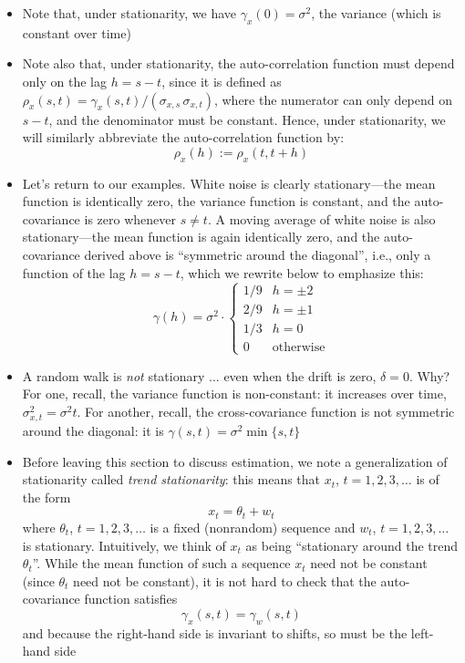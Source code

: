 \documentclass{article}
\begin{document}
\begin{itemize}
\item Note that, under stationarity, we have $\gamma_x(0) = \sigma^2$, the
  variance (which is constant over time) 

\item Note also that, under stationarity, the auto-correlation function must
  depend only on the lag $h = s-t$, since it is defined as $\rho_x(s, t) =
  \gamma_x(s, t) / ( \sigma_{x,s} \, \sigma_{x,t} )$, where the numerator can  
  only depend on $s-t$, and the denominator must be constant. Hence, under
  stationarity, we will similarly abbreviate the auto-correlation function by:
  \[
  \rho_x(h) := \rho_x(t, t+h)
  \]

\item Let's return to our examples. White noise is clearly stationary---the mean 
  function is identically zero, the variance function is constant, and the
  auto-covariance is zero whenever $s \not= t$. A moving average of white noise 
  is also stationary---the mean function is again identically zero, and the
  auto-covariance derived above is ``symmetric around the diagonal'', i.e., only
  a function of the lag $h = s-t$, which we rewrite below to emphasize this:   
  \[
  \gamma(h) = \sigma^2 \cdot
  \begin{cases}
  1 / 9 & h = \pm 2 \\
  2 / 9 & h = \pm 1 \\
  1 / 3 & h = 0 \\
  0 & \text{otherwise}
  \end{cases}
  \]

\item A random walk is \emph{not} stationary ... even when the drift is zero,
  $\delta = 0$. Why? For one, recall, the variance function is non-constant: it
  increases over time, $\sigma^2_{x,t} = \sigma^2 t$. For another, recall, the 
  cross-covariance function is not symmetric around the diagonal: it is
  $\gamma(s,t) = \sigma^2 \min\{s,t\}$ 

\item Before leaving this section to discuss estimation, we note a
  generalization of stationarity called \emph{trend stationarity}: this means
  that $x_t$, $t = 1,2,3,\dots$ is of the form 
  \[ 
  x_t = \theta_t + w_t
  \]
  where $\theta_t$, $t = 1,2,3,\dots$ is a fixed (nonrandom) sequence and $w_t$,
  $t = 1,2,3,\dots$ is stationary. Intuitively, we think of $x_t$ as being
  ``stationary around the trend $\theta_t$''. While the mean function of such a
  sequence $x_t$ need not be constant (since $\theta_t$ need not be constant),
  it is not hard to check that the auto-covariance function satisfies
  \[
  \gamma_x(s,t) = \gamma_w(s,t)
  \]
  and because the right-hand side is invariant to shifts, so must be the
  left-hand side 
\end{itemize}
\end{document}
